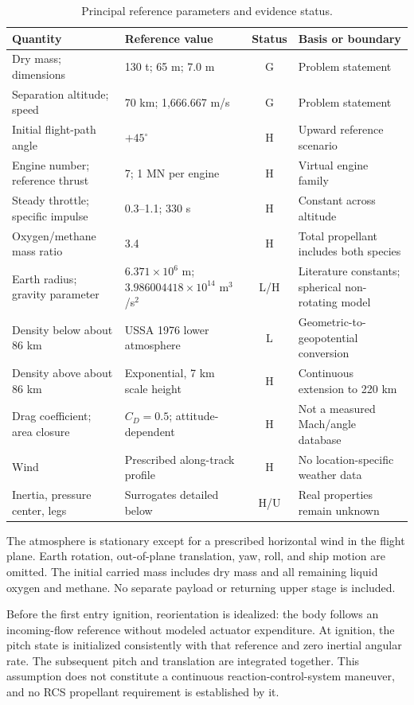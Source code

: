 \documentclass[11pt,a4paper]{article}
\begin{document}
\begin{table}[htbp]
\caption{Principal reference parameters and evidence status.}
\label{tab:parameters}
\small
\begin{tabularx}{\linewidth}{@{}p{.25\linewidth}p{.27\linewidth}cX@{}}
\toprule
Quantity & Reference value & Status & Basis or boundary\\
\midrule
Dry mass; dimensions & 130 t; 65 m; 7.0 m & G & Problem statement\\
Separation altitude; speed & 70 km; 1,666.667 m/s & G & Problem statement\\
Initial flight-path angle & $+45^\circ$ & H & Upward reference scenario\\
Engine number; reference thrust & 7; 1 MN per engine & H & Virtual engine family\\
Steady throttle; specific impulse & 0.3--1.1; 330 s & H & Constant across altitude\\
Oxygen/methane mass ratio & 3.4 & H & Total propellant includes both species\\
Earth radius; gravity parameter & $6.371\!\times\!10^6$ m; $3.986004418\!\times\!10^{14}$ m$^3$/s$^2$ & L/H & Literature constants; spherical non-rotating model\\
Density below about 86 km & USSA 1976 lower atmosphere & L & Geometric-to-geopotential conversion\\
Density above about 86 km & Exponential, 7 km scale height & H & Continuous extension to 220 km\\
Drag coefficient; area closure & $C_D=0.5$; attitude-dependent & H & Not a measured Mach/angle database\\
Wind & Prescribed along-track profile & H & No location-specific weather data\\
Inertia, pressure center, legs & Surrogates detailed below & H/U & Real properties remain unknown\\
\bottomrule
\end{tabularx}
\end{table}

The atmosphere is stationary except for a prescribed horizontal wind in the flight plane. Earth rotation, out-of-plane translation, yaw, roll, and ship motion are omitted. The initial carried mass includes dry mass and all remaining liquid oxygen and methane. No separate payload or returning upper stage is included.

Before the first entry ignition, reorientation is idealized: the body follows an incoming-flow reference without modeled actuator expenditure. At ignition, the pitch state is initialized consistently with that reference and zero inertial angular rate. The subsequent pitch and translation are integrated together. This assumption does not constitute a continuous reaction-control-system maneuver, and no RCS propellant requirement is established by it.
\end{document}
